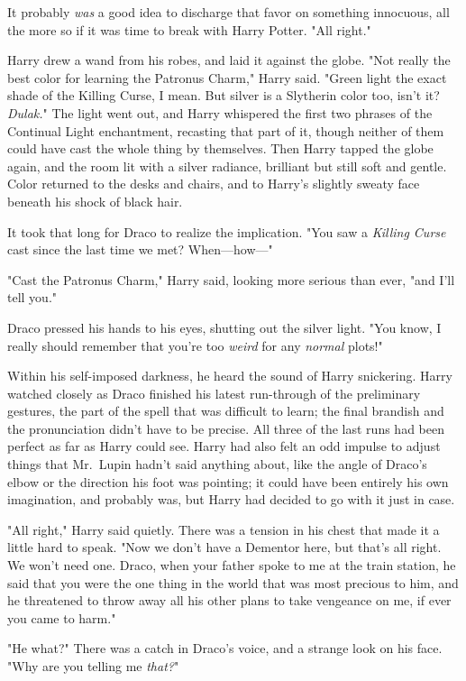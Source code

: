 {\el} It probably \emph{was} a good idea to discharge that favor on something
innocuous, all the more so if it was time to break with Harry Potter. "All
right."

Harry drew a wand from his robes, and laid it against the globe. "Not really
the best color for learning the Patronus Charm," Harry said. "Green light the
exact shade of the Killing Curse, I mean. But silver is a Slytherin color too,
isn't it? \emph{Dulak.}" The light went out, and Harry whispered the first two
phrases of the Continual Light enchantment, recasting that part of it, though
neither of them could have cast the whole thing by themselves. Then Harry
tapped the globe again, and the room lit with a silver radiance, brilliant but
still soft and gentle. Color returned to the desks and chairs, and to Harry's
slightly sweaty face beneath his shock of black hair.

It took that long for Draco to realize the implication. "You saw a
\emph{Killing Curse} cast since the last time we met? When---how\mbox{---}"

"Cast the Patronus Charm," Harry said, looking more serious than ever, "and
I'll tell you."

Draco pressed his hands to his eyes, shutting out the silver light. "You know,
I really should remember that you're too \emph{weird} for any \emph{normal}
plots!"

Within his self-imposed darkness, he heard the sound of Harry snickering.
\sbreak
Harry watched closely as Draco finished his latest run-through of the
preliminary gestures, the part of the spell that was difficult to learn; the
final brandish and the pronunciation didn't have to be precise. All three of
the last runs had been perfect as far as Harry could see. Harry had also felt
an odd impulse to adjust things that Mr.~Lupin hadn't said anything about, like
the angle of Draco's elbow or the direction his foot was pointing; it could
have been entirely his own imagination, and probably was, but Harry had decided
to go with it just in case.

"All right," Harry said quietly. There was a tension in his chest that made it
a little hard to speak. "Now we don't have a Dementor here, but that's all
right. We won't need one. Draco, when your father spoke to me at the train
station, he said that you were the one thing in the world that was most
precious to him, and he threatened to throw away all his other plans to take
vengeance on me, if ever you came to harm."

"He{\el} what?" There was a catch in Draco's voice, and a strange look on
his face. "Why are you telling me \emph{that?}"

